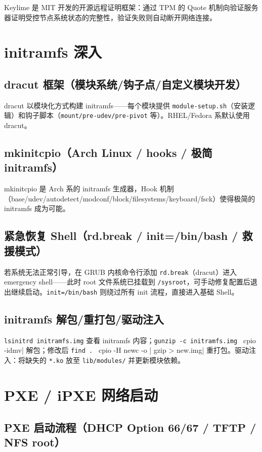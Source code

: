 \documentclass[12pt,UTF8]{ctexbook}
\begin{document}
Keylime 是 MIT 开发的开源远程证明框架：通过 TPM 的 Quote 机制向验证服务器证明受控节点系统状态的完整性，验证失败则自动断开网络连接。

  \section{initramfs 深入}
    \subsection{dracut 框架（模块系统/钩子点/自定义模块开发）}

dracut 以模块化方式构建 initramfs——每个模块提供 \verb|module-setup.sh|（安装逻辑）和钩子脚本（\verb|mount/pre-udev/pre-pivot| 等）。RHEL/Fedora 系默认使用 dracut。

    \subsection{mkinitcpio（Arch Linux / hooks / 极简 initramfs）}

mkinitcpio 是 Arch 系的 initramfs 生成器，Hook 机制（base/udev/autodetect/modconf/block/filesystems/keyboard/fsck）使得极简的 initramfs 成为可能。

    \subsection{紧急恢复 Shell（rd.break / init=/bin/bash / 救援模式）}

若系统无法正常引导，在 GRUB 内核命令行添加 \verb|rd.break|（dracut）进入 emergency shell——此时 root 文件系统已挂载到 \verb|/sysroot|，可手动修复配置后退出继续启动。\verb|init=/bin/bash| 则绕过所有 init 流程，直接进入基础 Shell。

    \subsection{initramfs 解包/重打包/驱动注入}

\verb|lsinitrd initramfs.img| 查看 initramfs 内容；\verb|gunzip -c initramfs.img | cpio -idmv| 解包；修改后 \verb|find . | cpio -H newc -o | gzip > new.img| 重打包。驱动注入：将缺失的 \verb|*.ko| 放至 \verb|lib/modules/| 并更新模块依赖。

  \section{PXE / iPXE 网络启动}
    \subsection{PXE 启动流程（DHCP Option 66/67 / TFTP / NFS root）}
\end{document}
